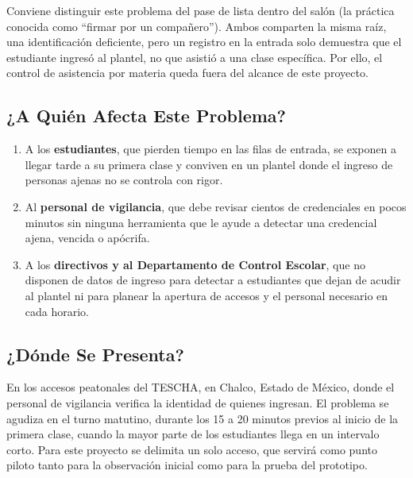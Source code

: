 \documentclass[stu,11pt,floatsintext,biblatex]{apa7}
\begin{document}
Conviene distinguir este problema del pase de lista dentro del salón (la
práctica conocida como ``firmar por un compañero''). Ambos comparten la misma
raíz, una identificación deficiente, pero un registro en la entrada solo
demuestra que el estudiante ingresó al plantel, no que asistió a una clase
específica. Por ello, el control de asistencia por materia queda fuera del
alcance de este proyecto.

\subsection{¿A Quién Afecta Este Problema?}
\begin{enumerate}
  \item A los \textbf{estudiantes}, que pierden tiempo en las filas de
  entrada, se exponen a llegar tarde a su primera clase y conviven en un
  plantel donde el ingreso de personas ajenas no se controla con rigor.
  \item Al \textbf{personal de vigilancia}, que debe revisar cientos de
  credenciales en pocos minutos sin ninguna herramienta que le ayude a
  detectar una credencial ajena, vencida o apócrifa.
  \item A los \textbf{directivos y al Departamento de Control Escolar}, que no
  disponen de datos de ingreso para detectar a estudiantes que dejan de acudir
  al plantel ni para planear la apertura de accesos y el personal necesario en
  cada horario.
\end{enumerate}

\subsection{¿Dónde Se Presenta?}
En los accesos peatonales del TESCHA, en Chalco, Estado de México, donde el
personal de vigilancia verifica la identidad de quienes ingresan. El problema
se agudiza en el turno matutino, durante los 15 a 20 minutos previos al
inicio de la primera clase, cuando la mayor parte de los estudiantes llega en
un intervalo corto. Para este proyecto se delimita un solo acceso, que servirá
como punto piloto tanto para la observación inicial como para la prueba del
prototipo.
\end{document}

